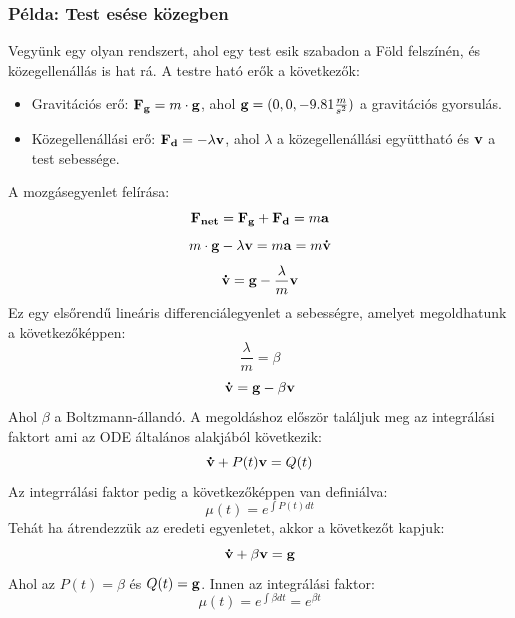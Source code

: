 \documentclass[../main.tex]{subfiles}
\begin{document}
\subsubsection*{Példa: Test esése közegben}
Vegyünk egy olyan rendszert, ahol egy test esik szabadon a Föld felszínén, és közegellenállás is hat rá. A testre ható erők a következők:
\begin{itemize}
    \item Gravitációs erő: $\bold{F_g} = m\cdot \bold{g}$, ahol $\bold{g} = (0, 0, -9.81 \frac{m}{s^2})$ a gravitációs gyorsulás.
    \item Közegellenállási erő: $\bold{F_d} = -\lambda\bold{v}$, ahol $\lambda$ a közegellenállási együttható és $\bold{v}$ a test sebessége.
\end{itemize}
A mozgásegyenlet felírása:
\begin{equation}
    \bold{F_{net}} = \bold{F_g} + \bold{F_d} = m\bold{a}
\end{equation}
\begin{equation}
    m\cdot \bold{g} - \lambda\bold{v} = m\bold{a} = m\bold{\dot{v}}
\end{equation}
\begin{equation}
    \bold{\dot{v}} = \bold{g} - \frac{\lambda}{m}\bold{v}
\end{equation}
Ez egy elsőrendű lineáris differenciálegyenlet a sebességre, amelyet megoldhatunk a következőképpen:
\begin{equation}
    \frac{\lambda}{m} = \beta
\end{equation}
\begin{equation}
    \bold{\dot{v}} = \bold{g} - \beta\bold{v}
\end{equation}
Ahol $\beta$ a Boltzmann-állandó. A megoldáshoz először találjuk meg az integrálási faktort ami az ODE általános alakjából következik:
\begin{equation}
    \bold{\dot{v}} + P(t)\bold{v} = Q(t)
\end{equation}
Az integrrálási faktor pedig a következőképpen van definiálva:
\begin{equation}
    \mu(t) = e^{\int P(t) dt}
\end{equation}
Tehát ha átrendezzük az eredeti egyenletet, akkor a következőt kapjuk:
\begin{equation}
    \bold{\dot{v}} + \beta\bold{v} = \bold{g}
\end{equation}
Ahol az $P(t) = \beta$ és $Q(t) = \bold{g}$. Innen az integrálási faktor:
\begin{equation}
    \mu(t) = e^{\int \beta dt} = e^{\beta t}
\end{equation}
\end{document}
